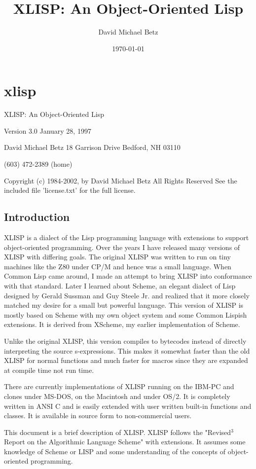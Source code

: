 \documentclass[11pt]{article}
\author{David Michael Betz}
\date{\today}
\title{XLISP: An Object-Oriented Lisp}
\begin{document}
\maketitle
\tableofcontents

\section{xlisp}
\label{sec-1}

XLISP: An Object-Oriented Lisp

Version 3.0
January 28, 1997

David Michael Betz
18 Garrison Drive
Bedford, NH 03110

(603) 472-2389 (home)

Copyright (c) 1984-2002, by David Michael Betz
All Rights Reserved
See the included file 'license.txt' for the full license.
\subsection{Introduction}
\label{sec-1-1}

XLISP is a dialect of the Lisp programming language with extensions
to support object-oriented programming. Over the years I have
released many versions of XLISP with differing goals. The original
XLISP was written to run on tiny machines like the Z80 under CP/M
and hence was a small language. When Common Lisp came around, I made
an attempt to bring XLISP into conformance with that standard. Later
I learned about Scheme, an elegant dialect of Lisp designed by
Gerald Sussman and Guy Steele Jr. and realized that it more closely
matched my desire for a small but powerful language. This version of
XLISP is mostly based on Scheme with my own object system and some
Common Lispish extensions. It is derived from XScheme, my earlier
implementation of Scheme.

Unlike the original XLISP, this version compiles to bytecodes
instead of directly interpreting the source s-expressions. This
makes it somewhat faster than the old XLISP for normal functions and
much faster for macros since they are expanded at compile time not
run time.

There are currently implementations of XLISP running on the IBM-PC
and clones under MS-DOS, on the Macintosh and under OS/2. It is
completely written in ANSI C and is easily extended with user
written built-in functions and classes. It is available in source
form to non-commercial users.

This document is a brief description of XLISP. XLISP follows the
"Revised$^{\text{3}}$ Report on the Algorithmic Language Scheme" with
extensions. It assumes some knowledge of Scheme or LISP and some
understanding of the concepts of object-oriented programming.
\end{document}
